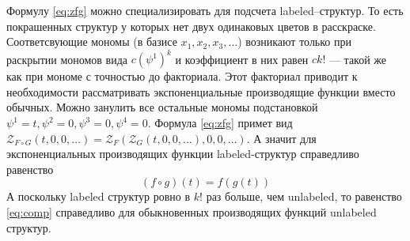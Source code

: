 Формулу \ref{eq:zfg} можно специализировать для подсчета labeled--структур. То
есть покрашенных структур у которых нет двух одинаковых цветов в расскраске.
Соответсвующие мономы (в базисе $x_1, x_2, x_3, \dots$) возникают только при
раскрытии мономов вида $c(\psi^1)^k$ и коэффициент в них равен $ck!$ --- такой
же как при мономе с точностью до факториала. Этот факториал приводит к
необходимости рассматривать экспоненциальные производящие функции вместо
обычных. Можно занулить все остальные мономы подстановкой $\psi^1 = t, \psi^2 =
0, \psi^3 = 0, \psi^4 = 0$. Формула \ref{eq:zfg} примет вид $
\mathcal Z_{F \circ G} (t, 0, 0, \dots) =
	\mathcal Z_F(
		\mathcal Z_G(t, 0, 0, \dots), 0, 0, \dots
	)
$.
А значит для экспоненциальных производящих функции labeled-структур справедливо
равенство
\begin{equation}
\label{eq:comp}
(f \circ g) (t) = f(g(t))
\end{equation}
А поскольку labeled структур ровно в $k!$ раз больше, чем unlabeled, то
равенство \ref{eq:comp} справедливо для обыкновенных производящих функций
unlabeled структур.

